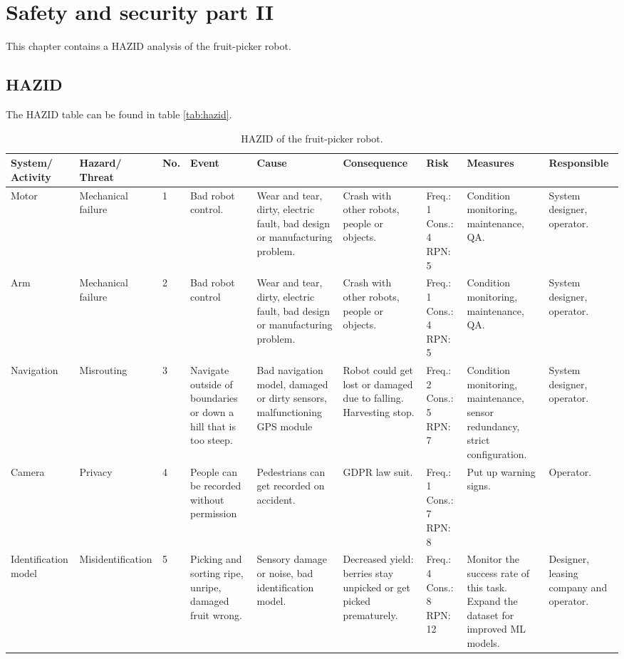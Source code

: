 \documentclass[%
oneside,    %
project,    %
nosummary   %
]{USN-MSc}
\begin{document}
\chapter{Safety and security part II}
\label{ch:safety2}
This chapter contains a HAZID analysis of the fruit-picker robot.
\section{HAZID}
The HAZID table can be found in table \ref{tab:hazid}.

\begin{landscape}
\begin{table}[!ht]
  \caption{HAZID of the fruit-picker robot.}
   \centering
    \begin{tabular}{ | m{2cm} | m{2cm} | m{1cm} | m{3cm} | m{3cm} | m{3cm} | m{2cm} | m{2cm} | m{2cm} |}
     \hline
     System/ Activity & Hazard/ Threat & No. & Event & Cause & Consequence & Risk & Measures & Responsible \\ \hline

     Motor & Mechanical failure & 1 & Bad robot control. & Wear and tear, dirty, electric fault, bad design or manufacturing problem. & Crash with other robots, people or objects. & Freq.: 1 Cons.: 4 RPN: 5 & Condition monitoring, maintenance, QA. & System designer, operator. \\ \hline

     Arm & Mechanical failure & 2 & Bad robot control & Wear and tear, dirty, electric fault, bad design or manufacturing problem. & Crash with other robots, people or objects. & Freq.: 1 Cons.: 4 RPN: 5 & Condition monitoring, maintenance, QA. & System designer, operator. \\ \hline

     Navigation & Misrouting & 3 & Navigate outside of boundaries or down a hill that is too steep. & Bad navigation model, damaged or dirty sensors, malfunctioning GPS module & Robot could get lost or damaged due to falling. Harvesting stop. & Freq.: 2 Cons.: 5 RPN: 7 & Condition monitoring, maintenance, sensor redundancy, strict configuration. & System designer, operator. \\ \hline

     Camera & Privacy & 4 & People can be recorded without permission & Pedestrians can get recorded on accident. & GDPR law suit. & Freq.: 1 Cons.: 7 RPN: 8 & Put up warning signs. & Operator. \\ \hline

     Identification model & Misidentification & 5 & Picking and sorting ripe, unripe, damaged fruit wrong. & Sensory damage or noise, bad identification model. & Decreased yield: berries stay unpicked or get picked prematurely. & Freq.: 4 Cons.: 8 RPN: 12 & Monitor the success rate of this task. Expand the dataset for improved ML models. & Designer, leasing company and operator. \\ \hline


\end{tabular}
\end{table}
\end{landscape}
\end{document}
